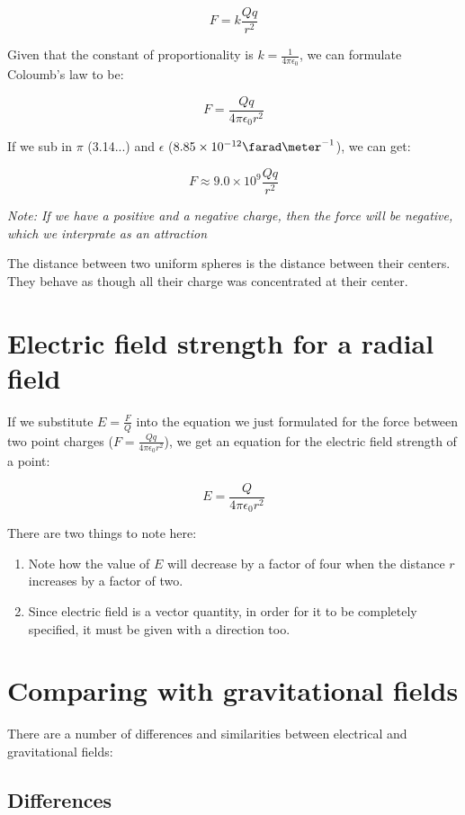\documentclass{article}
\begin{document}
\[
	F=k\frac{Qq}{r^2}
\]

Given that the constant of proportionality is $k=\frac{1}{4\pi\epsilon_0}$, we
can formulate Coloumb's law to be:

\[
	F = \frac{Qq}{4\pi\epsilon_0r^2}
\]

If we sub in $\pi$ (3.14...) and $\epsilon$
($8.85\times10^{-12}\farad\meter^{-1}$), we can get:

\[
	F \approx 9.0\times10^9\frac{Qq}{r^2}
\]

{\it Note: If we have a positive and a negative charge, then the force will be
negative, which we interprate as an attraction}

The distance between two uniform spheres is the distance between their centers.
They behave as though all their charge was concentrated at their center.

\section*{Electric field strength for a radial field}

If we substitute $E=\frac{F}{Q}$ into the equation we just formulated for the
force between two point charges ($F = \frac{Qq}{4\pi\epsilon_0r^2}$), we get an
equation for the electric field strength of a point:

\[
	E = \frac{Q}{4\pi\epsilon_0r^2}
\]

There are two things to note here:

\begin{enumerate}

	\item Note how the value of $E$ will decrease by a factor of four when the
	distance $r$ increases by a factor of two.

	\item Since electric field is a vector quantity, in order for it to be
	completely specified, it must be given with a direction too.

\end{enumerate}

\section*{Comparing with gravitational fields}

There are a number of differences and similarities between electrical and
gravitational fields:

\subsection*{Differences}
\end{document}
